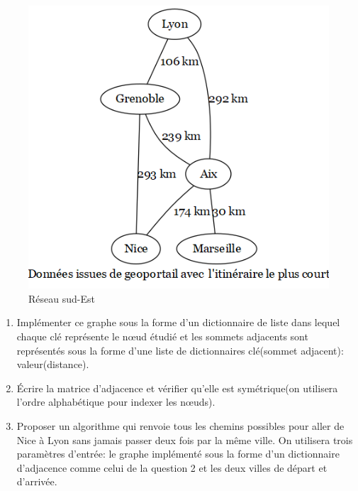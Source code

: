 \documentclass[
  letterpaper,
  DIV=11,
  numbers=noendperiod]{scrartcl}
\providecommand{\tightlist}{%
  \setlength{\itemsep}{0pt}\setlength{\parskip}{0pt}}\usepackage{longtable,booktabs,array}
\begin{document}
\begin{figure}

{\centering \includegraphics{reseau-routier-sud-est.png}

}

\caption{Réseau sud-Est}

\end{figure}

\begin{enumerate}
\def\labelenumi{\arabic{enumi}.}
\tightlist
\item
  Implémenter ce graphe sous la forme d'un dictionnaire de liste dans
  lequel chaque clé représente le nœud étudié et les sommets adjacents
  sont représentés sous la forme d'une liste de dictionnaires clé(sommet
  adjacent): valeur(distance).
\item
  Écrire la matrice d'adjacence et vérifier qu'elle est symétrique(on
  utilisera l'ordre alphabétique pour indexer les nœuds).
\item
  Proposer un algorithme qui renvoie tous les chemins possibles pour
  aller de Nice à Lyon sans jamais passer deux fois par la même ville.
  On utilisera trois paramètres d'entrée: le graphe implémenté sous la
  forme d'un dictionnaire d'adjacence comme celui de la question 2 et
  les deux villes de départ et d'arrivée.
\end{enumerate}
\end{document}
